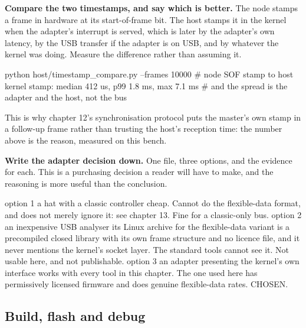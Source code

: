 \begin{steps}
\item \textbf{Compare the two timestamps, and say which is better.} The node
stamps a frame in hardware at its start-of-frame bit. The host stamps it in the
kernel when the adapter's interrupt is served, which is later by the adapter's
own latency, by the USB transfer if the adapter is on USB, and by whatever the
kernel was doing. Measure the difference rather than assuming it.
\begin{shellcode}
python host/timestamp_compare.py --frames 10000
# node SOF stamp to host kernel stamp: median 412 us, p99 1.8 ms, max 7.1 ms
# and the spread is the adapter and the host, not the bus
\end{shellcode}
This is why chapter 12's synchronisation protocol puts the master's own stamp in
a follow-up frame rather than trusting the host's reception time: the number
above is the reason, measured on this bench.

\item \textbf{Write the adapter decision down.} One file, three options, and the
evidence for each. This is a purchasing decision a reader will have to make, and
the reasoning is more useful than the conclusion.
\begin{plaincode}
option 1  a hat with a classic controller
          cheap. Cannot do the flexible-data format, and does not merely
          ignore it: see chapter 13. Fine for a classic-only bus.
option 2  an inexpensive USB analyser
          its Linux archive for the flexible-data variant is a precompiled
          closed library with its own frame structure and no licence file,
          and it never mentions the kernel's socket layer. The standard
          tools cannot see it. Not usable here, and not publishable.
option 3  an adapter presenting the kernel's own interface
          works with every tool in this chapter. The one used here has
          permissively licensed firmware and does genuine flexible-data
          rates. CHOSEN.
\end{plaincode}
\end{steps}

\subsection*{Build, flash and debug}


